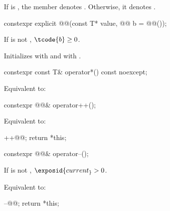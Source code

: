 \pnum
If  is ,
the member  
denotes .
Otherwise, it denotes .

%
\begin{itemdecl}
constexpr explicit @@(const T* value, @@ b = @@());
\end{itemdecl}

\begin{itemdescr}
\pnum
\expects
If  is not , $\tcode{b} \ge 0$.

\pnum
\effects
Initializes  with  and
 with .
\end{itemdescr}

%
\begin{itemdecl}
constexpr const T& operator*() const noexcept;
\end{itemdecl}

\begin{itemdescr}
\pnum
\effects
Equivalent to: 
\end{itemdescr}

%
\begin{itemdecl}
constexpr @@& operator++();
\end{itemdecl}

\begin{itemdescr}
\pnum
\effects
Equivalent to:
\begin{codeblock}
++@@;
return *this;
\end{codeblock}
\end{itemdescr}

%
\begin{itemdecl}
constexpr @@& operator--();
\end{itemdecl}

\begin{itemdescr}
\pnum
\expects
If  is not ,
$\exposid{current_} > 0$.

\pnum
\effects
Equivalent to:
\begin{codeblock}
--@@;
return *this;
\end{codeblock}
\end{itemdescr}

